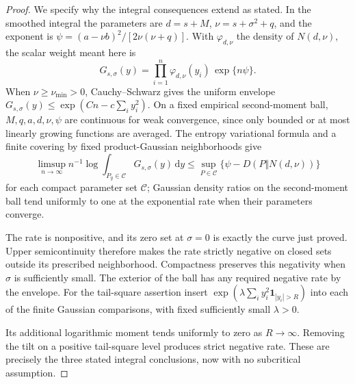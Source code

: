 \begin{proof}
We specify why the integral consequences extend as stated.  In the
smoothed integral the parameters are
$d=s+M$, $\nu=s+\sigma^2+q$, and the exponent is
$\psi=(a-\nu b)^2/[2\nu(\nu+q)]$.
With $\varphi_{d,\nu}$ the density of $N(d,\nu)$, the scalar
weight meant here is
\[
 G_{s,\sigma}(y)=
       \prod_{i=1}^n\varphi_{d,\nu}(y_i)\,\exp\{n\psi\}.
\]
When $\nu\ge\nu_{\min}>0$, Cauchy--Schwarz gives the uniform envelope
$G_{s,\sigma}(y)\le\exp(Cn-c\sum_i y_i^2)$. On a fixed empirical second-moment
ball, $M,q,a,d,\nu,\psi$ are continuous for weak convergence, since
only bounded or at most linearly growing functions are averaged.
The entropy variational formula and a finite covering by fixed
product-Gaussian neighborhoods give
\[
 \limsup_{n\to\infty}n^{-1}\log\int_{P_y\in\mathcal C}G_{s,\sigma}(y)\,\mathrm dy
 \le\sup_{P\in\mathcal C}\{\psi-D(P\Vert N(d,\nu))\}
\]
for each compact parameter set $\mathcal C$; Gaussian density ratios
on the second-moment ball tend uniformly to one at the exponential
rate when their parameters converge.

The rate is nonpositive, and
its zero set at $\sigma=0$ is exactly the curve just proved.
Upper semicontinuity therefore makes the rate strictly negative on
closed sets outside its prescribed neighborhood.  Compactness preserves
this negativity when $\sigma$ is sufficiently small.  The exterior of
the ball has any required negative rate by the envelope.
For the tail-square assertion insert
$\exp(\lambda\sum_i y_i^2\mathbf1_{|y_i|>R})$ into each of the finite
Gaussian comparisons, with fixed sufficiently small $\lambda>0$.

Its additional logarithmic moment tends uniformly to zero as
$R\to\infty$.  Removing the tilt on a positive tail-square level
produces strict negative rate.  These are precisely the three stated
integral conclusions, now with no subcritical assumption.
\end{proof}

